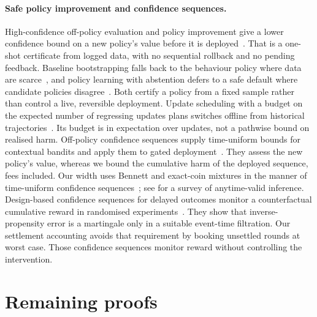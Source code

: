\documentclass[10pt]{article}
\theoremstyle{plain}
\theoremstyle{definition}
\begin{document}
\paragraph{Safe policy improvement and confidence sequences.}
High-confidence off-policy evaluation and policy improvement give a lower confidence bound on a new policy's value before it is deployed~\citep{thomas2015hcope,thomas2015hcpi}. That is a one-shot certificate from logged data, with no sequential rollback and no pending feedback. Baseline bootstrapping falls back to the behaviour policy where data are scarce~\citep{laroche2019spibb}, and policy learning with abstention defers to a safe default where candidate policies disagree~\citep{sawarni2025abstention}. Both certify a policy from a fixed sample rather than control a live, reversible deployment. Update scheduling with a budget on the expected number of regressing updates plans switches offline from historical trajectories~\citep{zhou2026metapolicy}. Its budget is in expectation over updates, not a pathwise bound on realised harm. Off-policy confidence sequences supply time-uniform bounds for contextual bandits and apply them to gated deployment~\citep{karampatziakis2021offpolicy}. They assess the new policy's value, whereas we bound the cumulative harm of the deployed sequence, fees included. Our width uses Bennett and exact-coin mixtures in the manner of time-uniform confidence sequences~\citep{howard2021time,waudbysmith2024betting}; see \citet{ramdas2023savi} for a survey of anytime-valid inference. Design-based confidence sequences for delayed outcomes monitor a counterfactual cumulative reward in randomised experiments~\citep{lindon2026design}. They show that inverse-propensity error is a martingale only in a suitable event-time filtration. Our settlement accounting avoids that requirement by booking unsettled rounds at worst case. Those confidence sequences monitor reward without controlling the intervention.

\section{Remaining proofs}\label{app:proofs}
\end{document}
